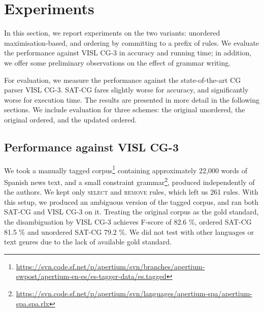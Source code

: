 \section{Experiments}
\label{sec:eval}

In this section, we report experiments on the two variants: unordered maximisation-based, and ordering by committing to a prefix of rules.
We evaluate the performance against VISL CG-3 in accuracy and running time; in addition, we offer some preliminary observations on the effect of grammar writing.


For evaluation, we measure the performance against the state-of-the-art CG parser VISL CG-3.
SAT-CG fares slightly worse for accuracy, and significantly worse for execution time.
The results are presented in more detail in the following sections.
We include evaluation for three schemes: the original unordered, the original ordered, and the updated ordered.




\subsection{Performance against VISL CG-3}


We took a manually tagged
corpus\footnote{\url{https://svn.code.sf.net/p/apertium/svn/branches/apertium-swpost/apertium-en-es/es-tagger-data/es.tagged}}
containing approximately 22,000 words of Spanish news text, 
and a small constraint grammar\footnote{\url{https://svn.code.sf.net/p/apertium/svn/languages/apertium-spa/apertium-spa.spa.rlx}}, produced independently of the authors.
We kept only \textsc{select} and \textsc{remove} rules, which left us 261 rules.
With this setup, we produced an ambiguous version of the tagged
corpus, and ran both SAT-CG and VISL CG-3 on it.
Treating the original corpus as the gold standard, the disambiguation
by  VISL CG-3 achieves F-score of 82.6 \%, ordered SAT-CG 81.5 \%  and
unordered SAT-CG 79.2 \%. 
We did not test with other languages or text genres due to the lack of
available gold standard.


